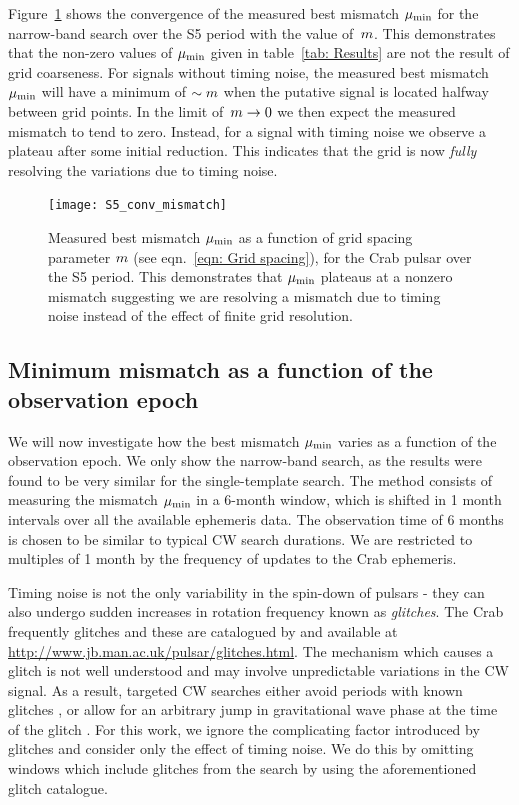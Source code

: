 \documentclass[../full_thesis/full_thesis.tex]{subfiles}
\begin{document}
Figure~\ref{fig: conv} shows the convergence of the measured best mismatch
$\mu_{\mathrm{min}}$ for the narrow-band search over the S5 period with the value
of~$m$.  This demonstrates that the non-zero values of $\mu_{\mathrm{min}}$ given in
table~\ref{tab: Results} are not the result of grid coarseness.  For signals
without timing noise, the measured best mismatch $\mu_{\mathrm{min}}$ will have a minimum
of $\sim m$ when the putative signal is located halfway between grid
points. In the limit of~$m \rightarrow 0$ we then expect the measured
mismatch to tend to zero. Instead, for a signal with timing noise we observe a
plateau after some initial reduction. This indicates that the grid is now
\emph{fully} resolving the variations due to timing noise.
\begin{figure}[htb]
\centering
\texttt{[image: S5\_conv\_mismatch]}
\caption{Measured best mismatch $\mu_{\mathrm{min}}$ as a function
of grid spacing parameter $m$ (see eqn.~\eqref{eqn: Grid spacing}), for the Crab pulsar over the S5 period.
    This demonstrates that $\mu_{\mathrm{min}}$ plateaus at a nonzero mismatch suggesting
    we are resolving a mismatch due to timing noise instead of the effect of finite
    grid resolution.}
\label{fig: conv}
\end{figure}





\subsection{Minimum mismatch as a function of the observation epoch}
\label{sec: Minimum mismatch as a function of the observation epoch}

We will now investigate how the best mismatch $\mu_{\mathrm{min}}$ varies as a function of
the observation epoch. We only show the narrow-band search, as the results were
found to be very similar for the single-template search. The method consists of
measuring the mismatch $\mu_{\mathrm{min}}$ in a 6-month window, which is shifted in 1
month intervals over all the available ephemeris data. The observation time of
6 months is chosen to be similar to typical CW search durations. We are
restricted to multiples of 1 month by the frequency of updates to the Crab
ephemeris.

Timing noise is not the only variability in the spin-down of pulsars - they can
also undergo sudden increases in rotation frequency known as \emph{glitches}.
The Crab frequently glitches and these are catalogued by \citet{Espinoza2011}
and available at \url{http://www.jb.man.ac.uk/pulsar/glitches.html}.
The mechanism which causes a glitch is not well understood and may involve
unpredictable variations in the CW signal. As a result, targeted CW searches
either avoid periods with known glitches \citep{ligo2008}, or
allow for an arbitrary jump in gravitational wave phase at the time of
the glitch \citep{LIGO2010}. For this work, we ignore
the complicating factor introduced by glitches and consider
only the effect of timing noise. We do this by
omitting windows which include glitches from the search by using
the aforementioned glitch catalogue.
\end{document}
